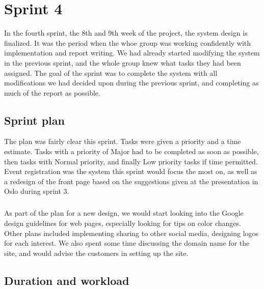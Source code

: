 \chapter{Sprint 4}
\label{chap:S5}

In the fourth sprint, the 8th and 9th week of the project, the system design is finalized. It was the period when the whoe group was working confidently with implementation and report writing. We had already started modifying the system in the previous sprint, and the whole group knew what tasks they had been assigned. The goal of the sprint was to complete the system with all modifications we had decided upon during the previous sprint, and completing as much of the report as possible.

\section{Sprint plan}
\label{sec:S5Plan}

The plan was fairly clear this sprint. Tasks were given a priority and a time estimate. Tasks with a priority of Major had to be completed as soon as possible, then tasks with Normal priority, and finally Low priority tasks if time permitted. Event registration was the system this sprint would focus the most on, as well as a redesign of the front page based on the suggestions given at the presentation in Oslo during sprint 3.

\paragraph{} As part of the plan for a new design, we would start looking into the Google design guidelines for web pages, especially looking for tips on color changes. Other plans included implementing sharing to other social media, designing logos for each interest. We also spent some time discussing the domain name for the site, and would advise the customers in setting up the site.

\section{Duration and workload}
\label{sec:S5Duration}

